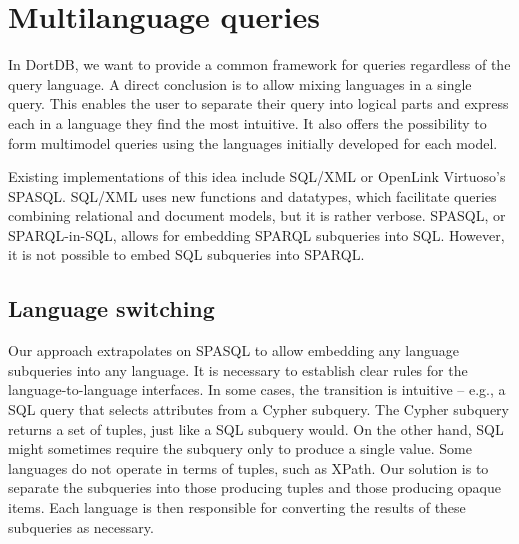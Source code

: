 \chapter{Multilanguage queries}
\label{chap:multilang-queries}

In DortDB, we want to provide a common framework for queries regardless of the query language. A direct conclusion is to allow mixing languages in a single query. This enables the user to separate their query into logical parts and express each in a language they find the most intuitive. It also offers the possibility to form multimodel queries using the languages initially developed for each model.

Existing implementations of this idea include SQL/XML or OpenLink Virtuoso's SPASQL\cite{virtuoso_spasql}. SQL/XML uses new functions and datatypes, which facilitate queries combining relational and document models, but it is rather verbose. SPASQL, or SPARQL-in-SQL, allows for embedding SPARQL subqueries into SQL. However, it is not possible to embed SQL subqueries into SPARQL.

\section{Language switching}

Our approach extrapolates on SPASQL to allow embedding any language subqueries into any language. It is necessary to establish clear rules for the language-to-language interfaces. In some cases, the transition is intuitive -- e.g., a SQL query that selects attributes from a Cypher subquery. The Cypher subquery returns a set of tuples, just like a SQL subquery would. On the other hand, SQL might sometimes require the subquery only to produce a single value. Some languages do not operate in terms of tuples, such as XPath. Our solution is to separate the subqueries into those producing tuples and those producing opaque items. Each language is then responsible for converting the results of these subqueries as necessary.

